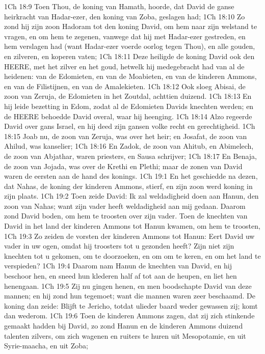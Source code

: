 1Ch 18:9  Toen Thou, de koning van Hamath, hoorde, dat David de ganse heirkracht van Hadar-ezer, den koning van Zoba, geslagen had;
1Ch 18:10  Zo zond hij zijn zoon Hadoram tot den koning David, om hem naar zijn welstand te vragen, en om hem te zegenen, vanwege dat hij met Hadar-ezer gestreden, en hem verslagen had (want Hadar-ezer voerde oorlog tegen Thou), en alle gouden, en zilveren, en koperen vaten;
1Ch 18:11  Deze heiligde de koning David ook den HEERE, met het zilver en het goud, hetwelk hij medegebracht had van al de heidenen: van de Edomieten, en van de Moabieten, en van de kinderen Ammons, en van de Filistijnen, en van de Amalekieten.
1Ch 18:12  Ook sloeg Abisai, de zoon van Zeruja, de Edomieten in het Zoutdal, achttien duizend.
1Ch 18:13  En hij leide bezetting in Edom, zodat al de Edomieten Davids knechten werden; en de HEERE behoedde David overal, waar hij heenging.
1Ch 18:14  Alzo regeerde David over gans Israel, en hij deed zijn gansen volke recht en gerechtigheid.
1Ch 18:15  Joab nu, de zoon van Zeruja, was over het heir; en Josafat, de zoon van Ahilud, was kanselier;
1Ch 18:16  En Zadok, de zoon van Ahitub, en Abimelech, de zoon van Abjathar, waren priesters, en Sausa schrijver;
1Ch 18:17  En Benaja, de zoon van Jojada, was over de Krethi en Plethi; maar de zonen van David waren de eersten aan de hand des konings.
1Ch 19:1  En het geschiedde na dezen, dat Nahas, de koning der kinderen Ammons, stierf, en zijn zoon werd koning in zijn plaats.
1Ch 19:2  Toen zeide David: Ik zal weldadigheid doen aan Hanun, den zoon van Nahas; want zijn vader heeft weldadigheid aan mij gedaan. Daarom zond David boden, om hem te troosten over zijn vader. Toen de knechten van David in het land der kinderen Ammons tot Hanun kwamen, om hem te troosten,
1Ch 19:3  Zo zeiden de vorsten der kinderen Ammons tot Hanun: Eert David uw vader in uw ogen, omdat hij troosters tot u gezonden heeft? Zijn niet zijn knechten tot u gekomen, om te doorzoeken, en om om te keren, en om het land te verspieden?
1Ch 19:4  Daarom nam Hanun de knechten van David, en hij beschoor hen, en sneed hun klederen half af tot aan de heupen, en liet hen henengaan.
1Ch 19:5  Zij nu gingen henen, en men boodschapte David van deze mannen; en hij zond hun tegemoet; want die mannen waren zeer beschaamd. De koning dan zeide: Blijft te Jericho, totdat ulieder baard weder gewassen zij; komt dan wederom.
1Ch 19:6  Toen de kinderen Ammons zagen, dat zij zich stinkende gemaakt hadden bij David, zo zond Hanun en de kinderen Ammons duizend talenten zilvers, om zich wagenen en ruiters te huren uit Mesopotamie, en uit Syrie-maacha, en uit Zoba;
